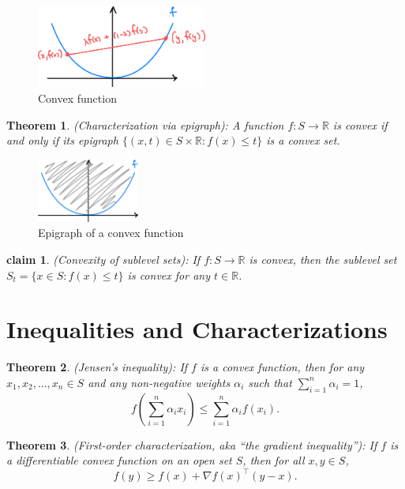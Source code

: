 \documentclass[11pt]{book} %
\newtheorem{theorem}{Theorem}[section]
\newtheorem{claim}{claim}[section]
\begin{document}
\begin{figure}[H]
    \centering
    \includegraphics[width=0.5\textwidth]{Figs/convex_function.png}
    \caption{Convex function}
\end{figure}

\begin{theorem} (Characterization via epigraph): A function $f : S \to \mathbb{R}$ is convex if and only if its epigraph $\{(x,t) \in S \times \mathbb{R} : f(x) \leq t\}$ is a convex set.
\end{theorem}

\begin{figure}[H]
    \centering
    \includegraphics[width=0.3\textwidth]{Figs/epigraph_of_convex_function.png}
    \caption{Epigraph of a convex function}
\end{figure}


\begin{claim} (Convexity of sublevel sets): If $f : S \to \mathbb{R}$ is convex, then the sublevel set $S_t = \{ x \in S : f(x) \leq t\}$ is convex for any $t \in \mathbb{R}$.
\end{claim}

\section{Inequalities and Characterizations}

\begin{theorem}(Jensen's inequality): If $f$ is a convex function, then for any $x_1, x_2, \ldots, x_n \in S$ and any non-negative weights $\alpha_i$ such that $\sum_{i=1}^n \alpha_i = 1$,
\[ f\left(\sum_{i=1}^n \alpha_i x_i\right) \leq \sum_{i=1}^n \alpha_i f(x_i). \]
\end{theorem}


\begin{theorem}(First-order characterization, aka “the gradient inequality”): If $f$ is a differentiable convex function on an open set $S$, then for all $x, y \in S$,
\[ f(y) \geq f(x) + \nabla f(x)^\top (y - x). \]
\end{theorem}
\end{document}
